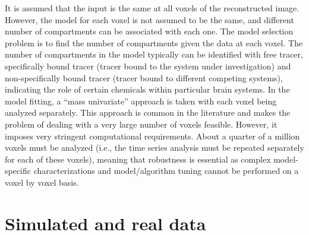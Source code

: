 It is assumed that the input is the same at all voxels of the reconstructed
image. However, the model for each voxel is not assumed to be the same, and
different number of compartments can be associated with each one. The model
selection problem is to find the number of compartments given the data at
each voxel. The number of compartments in the model typically can be
identified with free tracer, specifically bound tracer (tracer bound to the
system under investigation) and non-specifically bound tracer (tracer bound
to different competing systems), indicating the role of certain chemicals
within particular brain systems. In the model fitting, a ``mass univariate''
approach is taken with each voxel being analyzed separately. This approach is
common in the literature and makes the problem of dealing with a very large
number of voxels feasible. However, it imposes very stringent computational
requirements. About a quarter of a million voxels must be analyzed (i.e., the
time series analysis must be repeated separately for each of these voxels),
meaning that robustness is essential as complex model-specific
characterizations and model/algorithm tuning cannot be performed on a voxel
by voxel basis.

\section{Simulated and real \protect\pet data}
\label{sec:Simulated and real pet data}



